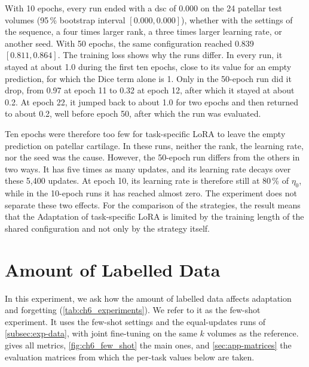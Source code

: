 With 10 epochs, every run ended with a \gls{dsc} of 0.000 on the 24 patellar test volumes (95\,\% bootstrap interval $[0.000, 0.000]$), whether with the settings of the sequence, a four times larger rank, a three times larger learning rate, or another seed.
With 50 epochs, the same configuration reached 0.839 $[0.811, 0.864]$.
The training loss shows why the runs differ.
In every run, it stayed at about 1.0 during the first ten epochs, close to its value for an empty prediction, for which the Dice term alone is 1.
Only in the 50-epoch run did it drop, from 0.97 at epoch 11 to 0.32 at epoch 12, after which it stayed at about 0.2.
At epoch 22, it jumped back to about 1.0 for two epochs and then returned to about 0.2, well before epoch 50, after which the run was evaluated.

Ten epochs were therefore too few for task-specific LoRA to leave the empty prediction on patellar cartilage.
In these runs, neither the rank, the learning rate, nor the seed was the cause.
However, the 50-epoch run differs from the others in two ways.
It has five times as many updates, and its learning rate decays over these 5{,}400 updates.
At epoch 10, its learning rate is therefore still at 80\,\% of $\eta_0$, while in the 10-epoch runs it has reached almost zero.
The experiment does not separate these two effects.
For the comparison of the strategies, the result means that the Adaptation of task-specific LoRA is limited by the training length of the shared configuration and not only by the strategy itself.

\section{Amount of Labelled Data}
\label{sec:exp-few-shot}
In this experiment, we ask how the amount of labelled data affects adaptation and forgetting (\cref{tab:ch6_experiments}).
We refer to it as the few-shot experiment.
It uses the few-shot settings and the equal-updates runs of \cref{subsec:exp-data}, with joint fine-tuning on the same $k$ volumes as the reference.
 gives all metrics, \cref{fig:ch6_few_shot} the main ones, and \cref{sec:app-matrices} the evaluation matrices from which the per-task values below are taken.

